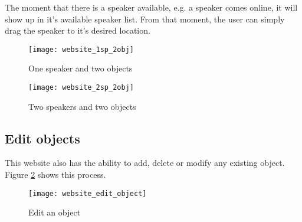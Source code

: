 The moment that there is a speaker available, e.g. a speaker comes online, it will show up in it's available speaker list.
From that moment, the user can simply drag the speaker to it's desired location.

\begin{figure}[H]
    \centering
        \begin{minipage}[b]{0.5\textwidth}
            \centering
            \texttt{[image: website\_1sp\_2obj]}
            \caption{One speaker and two objects}
            \label{fig:website_1sp_2obj}
        \end{minipage}%
        \begin{minipage}[b]{0.5\textwidth}
            \centering
            \texttt{[image: website\_2sp\_2obj]}
            \caption{Two speakers and two objects}
            \label{fig:website_2sp_2obj}
    \end{minipage}
\end{figure}

\subsection{Edit objects}
\label{sub:website_edit_objects}
This website also has the ability to add, delete or modify any existing object.
Figure \ref{fig:website_edit_object} shows this process.

\begin{figure}[H]
    \centering
    \texttt{[image: website\_edit\_object]}
    \caption{Edit an object}
    \label{fig:website_edit_object}
\end{figure}

